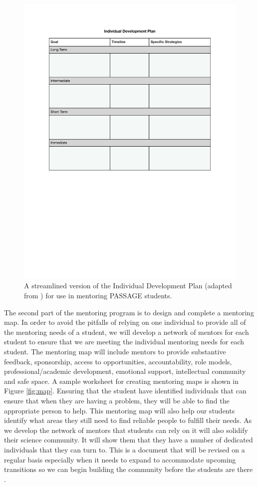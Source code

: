 \documentclass[12pt]{article}
\begin{document}
\begin{figure}
    \centering
    \includegraphics[width=5in]{IDP.pdf}
    \caption{A streamlined version of the Individual Development Plan (adapted from \citet{Bosch}) for use in mentoring PASSAGE students.}
    \label{fig:IDP}
\end{figure}

The second part of the mentoring program is to design and complete a mentoring map. In order to avoid the pitfalls of relying on one individual to provide all of the mentoring needs of a student, we will develop a network of mentors for each student to ensure that we are meeting the individual mentoring needs for each student.  The mentoring map will include mentors to provide substantive feedback, sponsorship, access to opportunities, accountability, role models, professional/academic development, emotional support, intellectual community and safe space. A sample worksheet for creating mentoring maps is shown in Figure \ref{fig:map}.  Ensuring that the student have identified individuals that can ensure that when they are having a problem, they will be able to find the appropriate person to help. This mentoring map will also help our students identify what areas they still need to find reliable people to fulfill their needs.  As we develop the network of mentors that students can rely on it will also solidify their science community. It will show them that they have a number of dedicated individuals that they can turn to.  This is a document that will be revised on a regular basis especially when it needs to expand to accommodate upcoming transitions so we can begin building the community before the students are there \citep{NAP25568}. 
\end{document}
